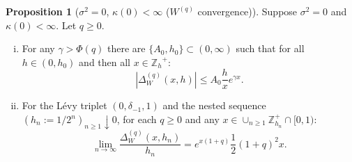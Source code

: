 \documentclass[pdftex,oneside,11pt,reqno]{amsart}
\theoremstyle{definition}
\theoremstyle{theorem}
\newtheorem{proposition}{Proposition}[section]
\theoremstyle{remark}
\numberwithin{equation}{section}
\numberwithin{definition}{section}
\begin{document}
\begin{proposition}[${\sigma^2}=0$, $\kappa(0)<\infty$  (${W^{(q)}}$ convergence)]\label{proposition:Wqconvergence:trivial_diffusion_FV}
Suppose ${\sigma^2}=0$ and $\kappa(0)<\infty$. Let $q\geq 0$. 

\begin{enumerate}[(i)]
\item\label{diffusion_zero_finite_variation:i} For any $\gamma>\Phi(q)$  there are $\{A_0,h_0\}\subset (0,\infty)$ such that for all $h\in (0,h_0)$ and then all $x\in {\mathbb{Z}_h}^{+}$: $$\left\vert{\Delta_{W}^{(q)}(x,h)}\right\vert\leq A_0\frac{h}{x}e^{\gamma x}.$$
\item\label{diffusion_zero_finite_variation:ii} For the L\'evy triplet $(0,\delta_{-1},1)$ and the nested sequence $(h_n:=1/2^n)_{n\geq 1}\downarrow 0$, for each $q\geq 0$ and any $x\in \cup_{n\geq 1}\mathbb{Z}_{h_n}^{+}\cap [0,1)$: $$\lim_{n\to\infty}\frac{\Delta_{W}^{(q)}(x,h_n)}{h_n}=e^{x(1+q)}\frac{1}{2}(1+q)^2x.$$
\end{enumerate}

\end{proposition}
\end{document}
